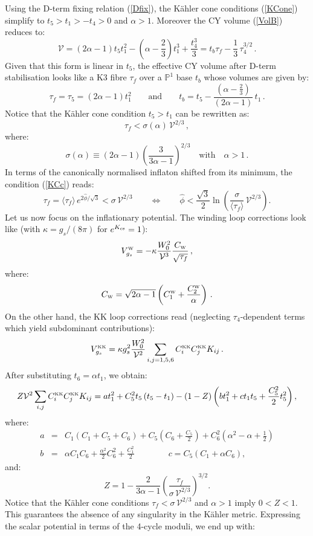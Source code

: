 \documentclass[11pt,a4paper]{article}
\newcommand{\bea}{\begin{eqnarray}}
\newcommand{\eea}{\end{eqnarray}}
\newcommand{\be}{\begin{equation}}
\newcommand{\ee}{\end{equation}}
\newcommand{\mP}{\mathbb{P}}
\def\nn{\nonumber}
\def\KK{{\scriptscriptstyle \rm KK}}
\def\W{{\scriptscriptstyle \rm W}}
\newcommand\vo{{\mathcal{V}}}
\begin{document}
Using the D-term fixing relation (\ref{Dfix}), the K\"ahler cone conditions (\ref{KCone}) simplify to $t_5>t_1>-t_4>0$ and $\alpha>1$. 
Moreover the CY volume (\ref{VolB}) reduces to:
\be
\vo = \left(2\alpha-1\right) t_5 t_1^2 - \left(\alpha-\frac23 \right) t_1^3 + \frac{t_4^3}{3}=t_b \tau_f -\frac13 \,\tau_4^{3/2}\,.
\ee
Given that this form is linear in $t_5$, the effective CY volume after D-term stabilisation looks like a K3 fibre $\tau_f$ over a $\mP^1$ base $t_b$ whose volumes are given by:
\be
\tau_f = \tau_5 = \left(2\alpha-1\right)  t_1^2\qquad\text{and}\qquad t_b = t_5 - \frac{\left(\alpha-\frac23 \right)}{\left(2\alpha-1\right)}\, t_1\,.
\ee
Notice that the K\"ahler cone condition $t_5>t_1$ can be rewritten as:
\be
\tau_f < \sigma(\alpha) \,\vo^{2/3}\,,
\label{KCc}
\ee
where:
\be
\sigma(\alpha) \equiv \left(2\alpha-1\right)\left(\frac{3}{3\alpha-1}\right)^{2/3}\quad\text{with}\quad \alpha>1\,.
\ee
In terms of the canonically normalised inflaton shifted from its minimum, the condition (\ref{KCc}) reads:
\be
\tau_f = \langle\tau_f\rangle\,e^{2\hat\phi/\sqrt{3}} < \sigma\,\vo^{2/3}\qquad\Leftrightarrow\qquad
\hat\phi<\frac{\sqrt{3}}{2}\ln\left(\frac{\sigma}{\langle\tau_f\rangle}\,\vo^{2/3}\right).
\label{KCbound}
\ee
Let us now focus on the inflationary potential. The winding loop corrections look like (with $\kappa=g_s/(8\pi)$ for $e^{K_{\rm cs}}=1$):
\be
V_{g_s}^\W=-\kappa\frac{W_0^2}{\vo^3}\frac{C_\W}{\sqrt{\tau_f}}\,,
\ee
where:
\be
C_\W= \sqrt{2\alpha-1}\left(C_1^\W+ \frac{C_2^\W}{\alpha}\right)\,.
\ee
On the other hand, the KK loop corrections read (neglecting $\tau_4$-dependent terms which yield subdominant contributions):
\be
V_{g_s}^\KK = \kappa g_s^2\frac{W_0^2}{\vo^2}\sum_{i,j=1,5,6} C_i^\KK C_j^\KK K_{ij}\,.
\ee
After substituting $t_6=\alpha t_1$, we obtain:
\be
Z\vo^2\sum_{i,j} C_i^\KK C_j^\KK K_{ij} = a t_1^2 + C_5^2 t_5\left(t_5 - t_1\right) -(1-Z)\left(b t_1^2 + c t_1 t_5 + \frac{C_5^2}{2} t_5^2 \right),  \nn
\ee
where:
\bea
a &=& C_1 \left(C_1+ C_5 + C_6\right) + C_5 \left(C_6+\frac{C_5}{2}\right) +C_6^2 \left(\alpha^2-\alpha+\frac12\right) \nn \\
b &=& \alpha C_1 C_6 + \frac{\alpha^2}{2} C_6^2  + \frac{C_1^2}{2}
\qquad \qquad c = C_5\left( C_1 + \alpha C_6\right), \nn
\eea
and:
\be
Z= 1-\frac{2}{3 \alpha-1}\left(\frac{\tau_f}{\sigma\,\vo^{2/3}}\right)^{3/2}. \nn
\ee
Notice that the K\"ahler cone conditions $\tau_f<\sigma\,\vo^{2/3}$ and $\alpha>1$ imply $0<Z<1$. 
This guarantees the absence of any singularity in the K\"ahler metric. Expressing the scalar potential in terms of the 4-cycle moduli, we end up with:
\end{document}
